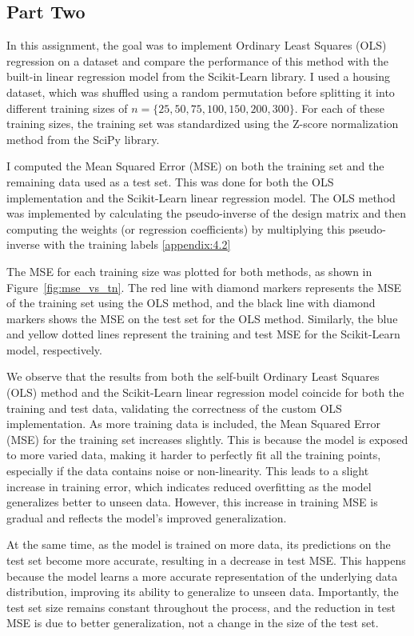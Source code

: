 \documentclass{article}
\begin{document}
\subsection{Part Two}
In this assignment, the goal was to implement Ordinary Least Squares (OLS) regression on a dataset and compare the performance of this method with the built-in linear regression model from the Scikit-Learn library. I used a housing dataset, which was shuffled using a random permutation before splitting it into different training sizes of \( n = \{25, 50, 75, 100, 150, 200, 300\} \). For each of these training sizes, the training set was standardized using the Z-score normalization method from the SciPy library.

I computed the Mean Squared Error (MSE) on both the training set and the remaining data used as a test set. This was done for both the OLS implementation and the Scikit-Learn linear regression model. The OLS method was implemented by calculating the pseudo-inverse of the design matrix and then computing the weights (or regression coefficients) by multiplying this pseudo-inverse with the training labels \ref{appendix:4.2} 

The MSE for each training size was plotted for both methods, as shown in Figure~\ref{fig:mse_vs_tn}. The red line with diamond markers represents the MSE of the training set using the OLS method, and the black line with diamond markers shows the MSE on the test set for the OLS method. Similarly, the blue and yellow dotted lines represent the training and test MSE for the Scikit-Learn model, respectively.

We observe that the results from both the self-built Ordinary Least Squares (OLS) method and the Scikit-Learn linear regression model coincide for both the training and test data, validating the correctness of the custom OLS implementation. As more training data is included, the Mean Squared Error (MSE) for the training set increases slightly. This is because the model is exposed to more varied data, making it harder to perfectly fit all the training points, especially if the data contains noise or non-linearity. This leads to a slight increase in training error, which indicates reduced overfitting as the model generalizes better to unseen data. However, this increase in training MSE is gradual and reflects the model's improved generalization.

At the same time, as the model is trained on more data, its predictions on the test set become more accurate, resulting in a decrease in test MSE. This happens because the model learns a more accurate representation of the underlying data distribution, improving its ability to generalize to unseen data. Importantly, the test set size remains constant throughout the process, and the reduction in test MSE is due to better generalization, not a change in the size of the test set.
\end{document}
